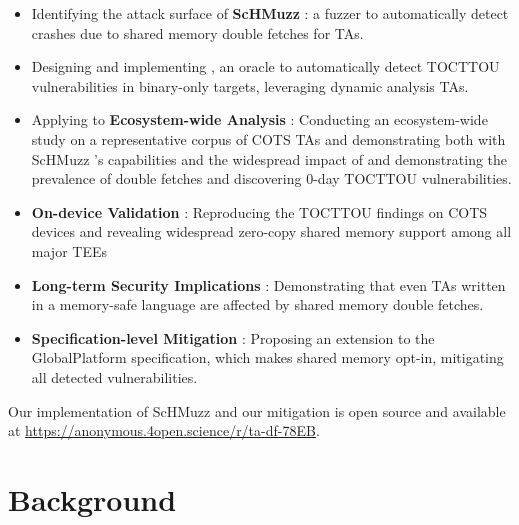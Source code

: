 \documentclass[conference]{IEEEtran} %
\newcommand{\sysname}{ScHMuzz\xspace}
\newcommand{\opensource}{\url{https://anonymous.4open.science/r/ta-df-78EB}\xspace}
\providecommand{\DIFaddtex}[1]{{\protect\color{blue} \sf #1}} %
\providecommand{\DIFdeltex}[1]{{\protect\color{red} \scriptsize #1}} %
\providecommand{\DIFaddbegin}{} %
\providecommand{\DIFaddend}{} %
\providecommand{\DIFdelbegin}{} %
\providecommand{\DIFdelend}{} %
\providecommand{\DIFadd}[1]{\texorpdfstring{\DIFaddtex{#1}}{#1}} %
\providecommand{\DIFdel}[1]{\texorpdfstring{\DIFdeltex{#1}}{}} %
\begin{document}
\begin{itemize}
    \item \DIFdelbegin \DIFdel{Identifying the attack surface of }\DIFdelend \DIFaddbegin \textbf{\sysname}\DIFadd{: a fuzzer to automatically detect crashes due to }\DIFaddend shared memory double fetches  
    \DIFdelbegin \DIFdel{for TAs.
    }%
\item%
\DIFdel{Designing and implementing }%
\DIFdel{, an oracle to automatically detect TOCTTOU vulnerabilities 
    }\DIFdelend in binary-only \DIFdelbegin \DIFdel{targets, leveraging dynamic analysis}\DIFdelend \DIFaddbegin \DIFadd{TAs}\DIFaddend .
    \item \DIFdelbegin \DIFdel{Applying }%
\DIFdel{to }\DIFdelend \DIFaddbegin \textbf{\DIFadd{Ecosystem-wide Analysis}}\DIFadd{: Conducting an ecosystem-wide study on }\DIFaddend a representative corpus of COTS TAs \DIFdelbegin \DIFdel{and demonstrating both }\DIFdelend \DIFaddbegin \DIFadd{with }\DIFaddend \sysname 
    \DIFdelbegin \DIFdel{'s capabilities 
    and the widespread impact of }\DIFdelend \DIFaddbegin \DIFadd{and demonstrating the prevalence of double fetches and discovering 0-day }\DIFaddend TOCTTOU 
    vulnerabilities.
    \item \DIFaddbegin \textbf{\DIFadd{On-device Validation}}\DIFadd{: Reproducing the TOCTTOU findings on COTS devices and revealing widespread 
    zero-copy shared memory support among all major TEEs
    }\item \textbf{\DIFadd{Long-term Security Implications}}\DIFadd{: }\DIFaddend Demonstrating that even TAs written in a memory-safe language are affected by shared memory 
    double fetches.
    \item \DIFaddbegin \textbf{\DIFadd{Specification-level Mitigation}}\DIFadd{: }\DIFaddend Proposing an extension to the GlobalPlatform specification, which makes shared memory 
    opt-in, mitigating all detected vulnerabilities.
\end{itemize}

Our implementation of \sysname and our mitigation is open source and available at \opensource.


\section{Background}\label{sec:background}
\end{document}
